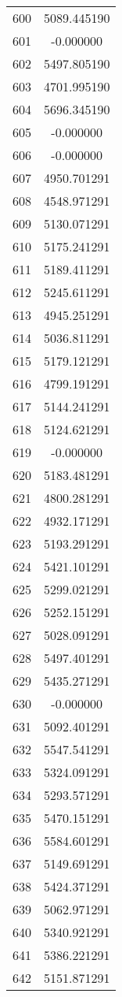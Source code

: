 \documentclass[12pt]{article}
\begin{document}
\begin{longtable}{@{}cc@{}}
600 & 5089.445190 \\
601 & -0.000000 \\
602 & 5497.805190 \\
603 & 4701.995190 \\
604 & 5696.345190 \\
605 & -0.000000 \\
606 & -0.000000 \\
607 & 4950.701291 \\
608 & 4548.971291 \\
609 & 5130.071291 \\
610 & 5175.241291 \\
611 & 5189.411291 \\
612 & 5245.611291 \\
613 & 4945.251291 \\
614 & 5036.811291 \\
615 & 5179.121291 \\
616 & 4799.191291 \\
617 & 5144.241291 \\
618 & 5124.621291 \\
619 & -0.000000 \\
620 & 5183.481291 \\
621 & 4800.281291 \\
622 & 4932.171291 \\
623 & 5193.291291 \\
624 & 5421.101291 \\
625 & 5299.021291 \\
626 & 5252.151291 \\
627 & 5028.091291 \\
628 & 5497.401291 \\
629 & 5435.271291 \\
630 & -0.000000 \\
631 & 5092.401291 \\
632 & 5547.541291 \\
633 & 5324.091291 \\
634 & 5293.571291 \\
635 & 5470.151291 \\
636 & 5584.601291 \\
637 & 5149.691291 \\
638 & 5424.371291 \\
639 & 5062.971291 \\
640 & 5340.921291 \\
641 & 5386.221291 \\
642 & 5151.871291 \\

\end{longtable}
\end{document}
